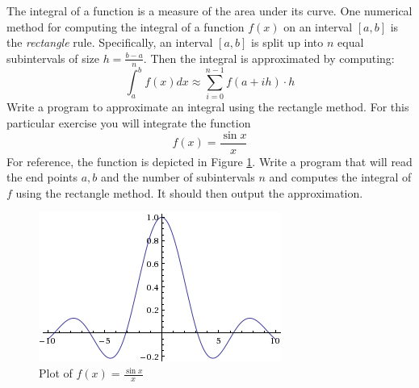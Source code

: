 \begin{exer}
The integral of a function is a measure of the area under its curve.  One numerical method for 
computing the integral of a function $f(x)$ on an interval $[a, b]$ is the \emph{rectangle} rule.
Specifically, an interval $[a, b]$ is split up into $n$ equal subintervals of size
$h = \frac{b-a}{n}$.  Then the integral is approximated by computing:
  $$\int_{a}^{b} f(x) dx \approx \sum_{i=0}^{n-1} f(a + ih) \cdot h$$
Write a program to approximate an integral using the rectangle method.  For this particular exercise you 
will integrate the function
  $$f(x) = \frac{\sin{x}}{x}$$
For reference, the function is depicted in Figure \ref{fig:sinxx}.  Write a program that will
read the end points $a, b$ and the number of subintervals $n$ and computes the integral 
of $f$ using the rectangle method.  It should then output the approximation.

\begin{figure}[h]
\centering
\includegraphics[scale=0.65]{images/sinxx}
\caption{Plot of $f(x) = \frac{\sin{x}}{x}$}
\label{fig:sinxx}
\end{figure}
\end{exer}

